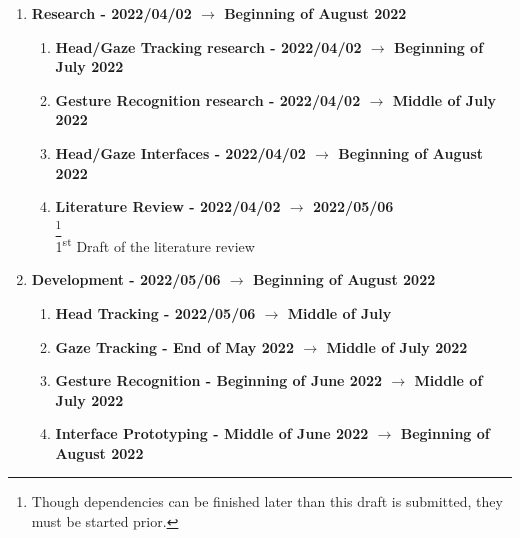 \begin{enumerate}
    \item \label{itm:research} \textbf{Research - 2022/04/02 $\rightarrow$ Beginning of August 2022}
        \begin{enumerate}
            \item \label{itm:tracking_design} \textbf{Head/Gaze Tracking research - 2022/04/02 $\rightarrow$ Beginning of July 2022}
            \item \label{itm:gesture_design} \textbf{Gesture Recognition research - 2022/04/02 $\rightarrow$ Middle of July 2022}
            \item \label{itm:interface_design} \textbf{Head/Gaze Interfaces - 2022/04/02 $\rightarrow$ Beginning of August 2022}
            \item \label{itm:lit_review_draft} \textbf{Literature Review - 2022/04/02 $\rightarrow$ 2022/05/06}\\
                \footnote{Though dependencies can be finished later than this draft is submitted, they must be started prior.}\\
                1\textsuperscript{st} Draft of the literature review
        \end{enumerate}
    \item \label{itm:development} \textbf{Development - 2022/05/06 $\rightarrow$ Beginning of August 2022}
        \begin{enumerate}
            \item \label{itm:head_tracking} \textbf{Head Tracking - 2022/05/06 $\rightarrow$ Middle of July}\\
            \item \label{itm:gaze_tracking} \textbf{Gaze Tracking - End of May 2022 $\rightarrow$ Middle of July 2022}\\
            \item \label{itm:gesture_recognition} \textbf{Gesture Recognition - Beginning of June 2022 $\rightarrow$ Middle of July 2022}\\
            \item \label{itm:interface} \textbf{Interface Prototyping - Middle of June 2022 $\rightarrow$ Beginning of August 2022}\\

\end{enumerate}
\end{enumerate}
